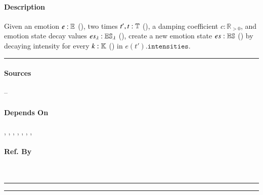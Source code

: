\paragraph{Description} Given an emotion $e : \mathbb{E}$
(), two times $t', t : \mathbb{T}$ (), a
damping coefficient $c : \mathbb{R}_{>0}$, and emotion state decay values
$es_\lambda : \mathbb{ES}_\lambda$ (), create a
new emotion state $es : \mathbb{ES}$ () by
decaying intensity for every $k : \mathbb{K}$ ()
in $e\left(t'\right).\mathtt{intensities}$. \\\hrule

\paragraph{Sources} --

\paragraph{Depends On} , ,
, , ,
, ,

\paragraph{Ref. By}  \\\hrule\vspace{0.5mm}\hrule

~\newline

